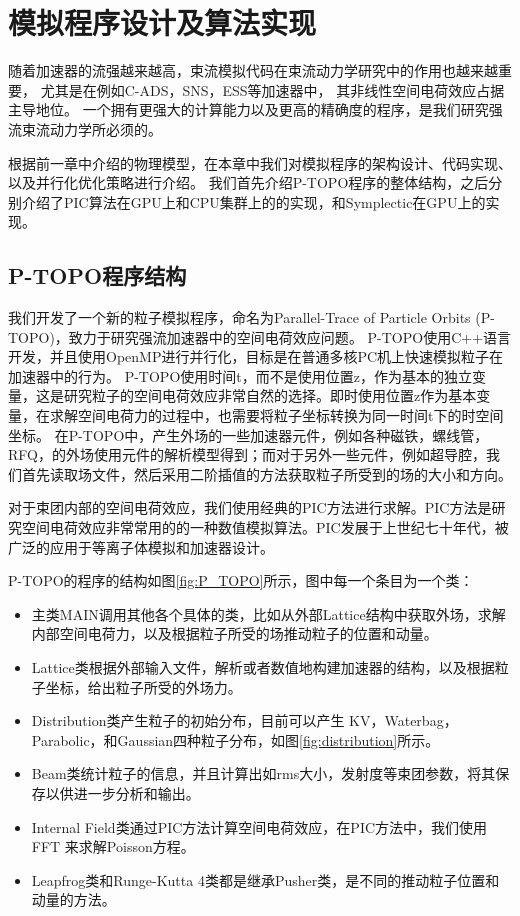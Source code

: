 
\chapter{模拟程序设计及算法实现}
\label{chap:Code}
随着加速器的流强越来越高，束流模拟代码在束流动力学研究中的作用也越来越重要，
尤其是在例如C-ADS，SNS，ESS等加速器中\cite{li2013ADS,henderson2014SNS,eshraqi2016ess}，
其非线性空间电荷效应占据主导地位。
一个拥有更强大的计算能力以及更高的精确度的程序，是我们研究强流束流动力学所必须的。

根据前一章中介绍的物理模型，在本章中我们对模拟程序的架构设计、代码实现、以及并行化优化策略进行介绍。
我们首先介绍P-TOPO程序的整体结构，之后分别介绍了PIC算法在GPU上和CPU集群上的的实现，和Symplectic在GPU上的实现。

\section{P-TOPO程序结构}
我们开发了一个新的粒子模拟程序，命名为Parallel-Trace of Particle Orbits (P-TOPO)，致力于研究强流加速器中的空间电荷效应问题\cite{li2016nonlinear,li2014envelope,li16collective,li2015space}。
P-TOPO使用C++语言开发，并且使用OpenMP进行并行化，目标是在普通多核PC机上快速模拟粒子在加速器中的行为。
P-TOPO使用时间t，而不是使用位置z，作为基本的独立变量，这是研究粒子的空间电荷效应非常自然的选择。即时使用位置z作为基本变量，在求解空间电荷力的过程中，也需要将粒子坐标转换为同一时间t下的时空间坐标。
在P-TOPO中，产生外场的一些加速器元件，例如各种磁铁，螺线管，RFQ，的外场使用元件的解析模型得到；而对于另外一些元件，例如超导腔，我们首先读取场文件\cite{studio2008cst}，然后采用二阶插值的方法获取粒子所受到的场的大小和方向。

对于束团内部的空间电荷效应，我们使用经典的PIC方法进行求解\cite{hockney1988computer}。PIC方法是研究空间电荷效应非常常用的的一种数值模拟算法\cite{PIC_birdsall2004plasma,PIC_luccio2002space}。PIC发展于上世纪七十年代，被广泛的应用于等离子体模拟和加速器设计。

P-TOPO的程序的结构如图\ref{fig:P_TOPO}所示，图中每一个条目为一个类：
\begin{itemize}
  \item 主类MAIN调用其他各个具体的类，比如从外部Lattice结构中获取外场，求解内部空间电荷力，以及根据粒子所受的场推动粒子的位置和动量。
  \item Lattice类根据外部输入文件，解析或者数值地构建加速器的结构，以及根据粒子坐标，给出粒子所受的外场力。
  \item Distribution类产生粒子的初始分布，目前可以产生 KV，Waterbag，Parabolic，和Gaussian四种粒子分布，如图\ref{fig:distribution}所示。
  \item Beam类统计粒子的信息，并且计算出如rms大小，发射度等束团参数，将其保存以供进一步分析和输出。
  \item Internal Field类通过PIC方法计算空间电荷效应，在PIC方法中，我们使用FFT 来求解Poisson方程。
  \item Leapfrog类和Runge-Kutta 4类都是继承Pusher类，是不同的推动粒子位置和动量的方法。
\end{itemize}

